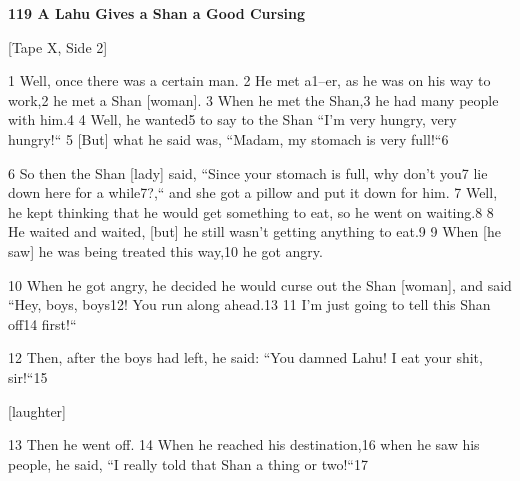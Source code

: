 
\textbf{119 A Lahu Gives a Shan a Good Cursing}

[Tape X, Side 2]

1 Well, once there was a certain man. 2 He met a1--er, as he was on his way to
work,2 he met a Shan [woman]. 3 When he met the Shan,3 he had many people with
him.4 4 Well, he wanted5 to say to the Shan ``I'm very hungry, very hungry!``
5 [But] what he said was, ``Madam, my stomach is very full!``6

6 So then the Shan [lady] said, ``Since your stomach is full, why don't
you7 lie down here for a while7?,`` and she got a pillow and put it down
for him. 7 Well, he kept thinking that he would get something to eat, so he went
on waiting.8 8 He waited and waited, [but] he still wasn't getting anything to
eat.9 9 When [he saw] he was being treated this way,10 he got angry.

10 When he got angry, he decided he would curse out the Shan [woman], and said
``Hey, boys, boys12! You run along ahead.13 11 I'm just going to tell this
Shan off14 first!``

12 Then, after the boys had left, he said: ``You damned Lahu! I eat your
shit, sir!``15

[laughter]

13 Then he went off. 14 When he reached his destination,16 when he saw his people,
he said, ``I really told that Shan a thing or two!``17

